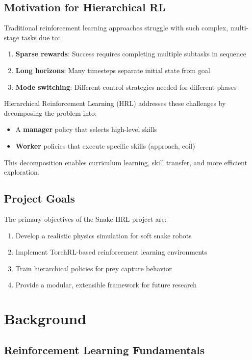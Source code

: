 \documentclass[11pt]{article}
\begin{document}
\subsection{Motivation for Hierarchical RL}

Traditional reinforcement learning approaches struggle with such complex, multi-stage tasks due to:
\begin{enumerate}
    \item \textbf{Sparse rewards}: Success requires completing multiple subtasks in sequence
    \item \textbf{Long horizons}: Many timesteps separate initial state from goal
    \item \textbf{Mode switching}: Different control strategies needed for different phases
\end{enumerate}

Hierarchical Reinforcement Learning (HRL) addresses these challenges by decomposing the problem into:
\begin{itemize}
    \item A \textbf{manager} policy that selects high-level skills
    \item \textbf{Worker} policies that execute specific skills (approach, coil)
\end{itemize}

This decomposition enables curriculum learning, skill transfer, and more efficient exploration.

\subsection{Project Goals}

The primary objectives of the Snake-HRL project are:
\begin{enumerate}
    \item Develop a realistic physics simulation for soft snake robots
    \item Implement TorchRL-based reinforcement learning environments
    \item Train hierarchical policies for prey capture behavior
    \item Provide a modular, extensible framework for future research
\end{enumerate}

\section{Background}

\subsection{Reinforcement Learning Fundamentals}
\end{document}
